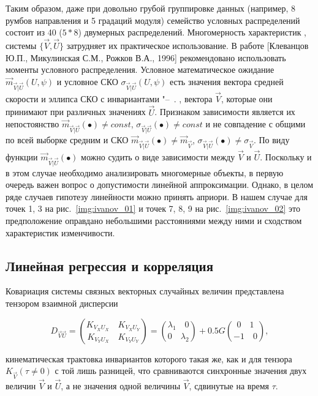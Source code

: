Таким образом, даже при довольно грубой группировке данных (например, 8 румбов направления и 5 градаций модуля) семейство условных распределений состоит из 40 ($5 \ast 8$) двумерных распределений.
Многомерность характеристик , системы  $\{\vec{V},\vec{U}\}$ затрудняет их практическое использование. В работе [Клеванцов Ю.П., Микулинская С.М., Рожков В.А., 1996] рекомендовано использовать моменты условного распределения. Условное математическое ожидание ${\vec{m}_{\vec{V}|\vec{U}}}(U,\psi)$ и условное СКО ${\sigma_{\vec{V}|\vec{U}}}(U,\psi)$ есть значения вектора средней скорости  и эллипса СКО  с инвариантами "--~. ,  вектора $\vec{V}$, которые они принимают при различных значениях $\vec{U}$. Признаком зависимости является их непостоянство ${\vec{m}_{\vec{V}|\vec{U}}}(\bullet)\ne{const}$, ${\sigma_{\vec{V}|\vec{U}}}(\bullet)\ne{const}$ и не совпадение с общими по всей выборке средним и СКО ${\vec{m}_{\vec{V}|\vec{U}}}(\bullet)\ne{\vec{m}_{\vec{V}}}$, ${\sigma_{\vec{V}|\vec{U}}}(\bullet)\ne{\sigma_{\vec{V}}}$. По виду функции ${\vec{m}_{\vec{V}|\vec{U}}}(\bullet)$ можно судить о виде зависимости между $\vec{V}$ и $\vec{U}$. Поскольку и в этом случае необходимо  анализировать многомерные объекты, в первую очередь важен вопрос о допустимости линейной аппроксимации. Однако, в целом ряде случаев гипотезу линейности можно принять априори. В нашем случае для точек 1, 3 на рис.~\ref{img:ivanov_01} и точек 7, 8, 9 на рис.~\ref{img:ivanov_02} это предположение оправдано небольшими расстояниями между ними и сходством характеристик изменчивости.

\subsection{Линейная регрессия и корреляция}
Ковариация системы связных векторных случайных величин представлена тензором взаимной дисперсии

\begin{equation}
\label{eq:equation3_20}
D_{\vec{V}\vec{U}} = {K_{V_{X}U_{X}}\quad K_{V_{X}U_{Y}}\choose K_{V_{Y}U_{X}}\quad K_{V_{Y}U_{Y}}}={{{\lambda_{1}\quad 0}}\choose 0\quad {\lambda_{2}}} + 0.5G{{0}\quad {1}\choose {-1}\quad {0}},
\end{equation} 

кинематическая трактовка инвариантов которого такая же, как и для тензора $K_{\vec{V}}(\tau\ne0)$ с той лишь разницей, что сравниваются синхронные значения двух величин $\vec{V}$ и $\vec{U}$, а не значения одной величины $\vec{V}$, сдвинутые на время $\tau$.
            
